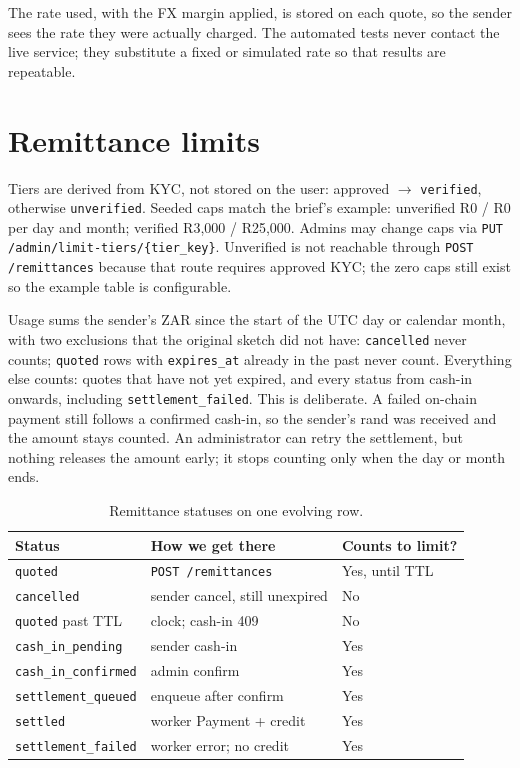 \documentclass[11pt]{article}
\begin{document}
The rate used, with the FX margin applied, is stored on each quote, so the sender sees the rate they were actually charged. The automated tests never contact the live service; they substitute a fixed or simulated rate so that results are repeatable.

\section{Remittance limits}
\label{sec:limits}
Tiers are derived from KYC, not stored on the user: approved $\to$ \texttt{verified}, otherwise \texttt{unverified}. Seeded caps match the brief's example: unverified R0 / R0 per day and month; verified R3{,}000 / R25{,}000. Admins may change caps via \texttt{PUT /admin/limit-tiers/\{tier\_key\}}. Unverified is not reachable through \texttt{POST /remittances} because that route requires approved KYC; the zero caps still exist so the example table is configurable.

Usage sums the sender's ZAR since the start of the UTC day or calendar month, with two exclusions that the original sketch did not have: \texttt{cancelled} never counts; \texttt{quoted} rows with \texttt{expires\_at} already in the past never count. Everything else counts: quotes that have not yet expired, and every status from cash-in onwards, including \texttt{settlement\_failed}. This is deliberate. A failed on-chain payment still follows a confirmed cash-in, so the sender's rand was received and the amount stays counted. An administrator can retry the settlement, but nothing releases the amount early; it stops counting only when the day or month ends.

\begin{table}[ht]
\centering
\caption{Remittance statuses on one evolving row.}
\label{tab:status}
\footnotesize
\begin{tabular}{@{}lll@{}}
\toprule
\textbf{Status} & \textbf{How we get there} & \textbf{Counts to limit?} \\
\midrule
\texttt{quoted} & \texttt{POST /remittances} & Yes, until TTL \\
\texttt{cancelled} & sender cancel, still unexpired & No \\
\texttt{quoted} past TTL & clock; cash-in 409 & No \\
\texttt{cash\_in\_pending} & sender cash-in & Yes \\
\texttt{cash\_in\_confirmed} & admin confirm & Yes \\
\texttt{settlement\_queued} & enqueue after confirm & Yes \\
\texttt{settled} & worker Payment + credit & Yes \\
\texttt{settlement\_failed} & worker error; no credit & Yes \\
\bottomrule
\end{tabular}
\end{table}
\end{document}
